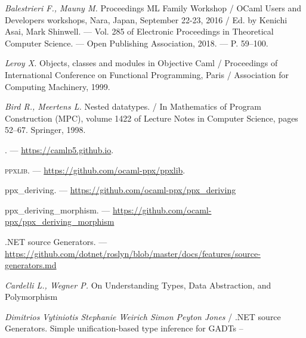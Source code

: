 \begin{thebibliography}{99}
{\em  Balestrieri F., Mauny M.} Proceedings ML Family Workshop / OCaml Users and Developers
workshops, Nara, Japan, September 22-23, 2016 / Ed. by Kenichi Asai,
Mark Shinwell. — Vol. 285 of Electronic Proceedings in Theoretical
Computer Science. — Open Publishing Association, 2018. — P. 59–100.

{\em       Leroy X.} 
Objects, classes and modules in Objective Caml / Proceedings of International Conference on Functional Programming, Paris /     Association for Computing Machinery, 1999.

{\em   Bird R.,  Meertens L.} 
 Nested datatypes.  /  In Mathematics of Program Construction
(MPC), volume 1422 of Lecture Notes in Computer Science, pages 52–67. Springer, 1998.


\camlpfive{}. --- \url{https://camlp5.github.io}.
 
\textsc{ppxlib}. --- \url{https://github.com/ocaml-ppx/ppxlib}.

ppx\_deriving. --- \url{https://github.com/ocaml-ppx/ppx\_deriving}

ppx\_deriving\_morphism. --- \url{https://github.com/ocaml-ppx/ppx\_deriving\_morphism}

.NET source Generators. --- \url{https://github.com/dotnet/roslyn/blob/master/docs/features/source-generators.md}


{\em Cardelli L., Wegner P.} On Understanding Types,
Data Abstraction, and Polymorphism



{\em Dimitrios Vytiniotis Stephanie Weirich Simon Peyton Jones } /
.NET source Generators. Simple unification-based type inference for GADTs -- 


\begin{comment}
\bibitem{AZ97}
{\em Абрамов С.А., Зима Е.В.} Семинар по компьютерной алгебре на
факультете вычислительной математики и кибернетики МГУ в 1995--1996 г.
// Программирование, 1997,
No 1. С. 75--77.

\bibitem{AZ98}
{\em Абрамов С.А., Зима Е.В.} Научно-ис\-сле\-до\-вательский семинар
``Компьютерная алгебра'' в 1996--1997 г.
// Программирование, 1998,
No 1. С. 69--72.


\end{comment}
\end{thebibliography}
